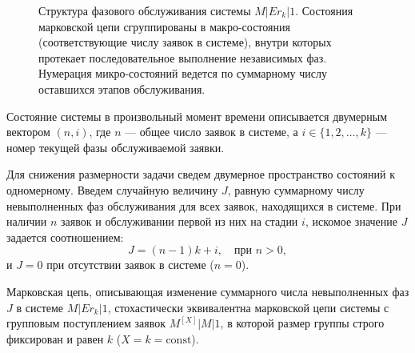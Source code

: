 \begin{figure}[h!]
\begin{center}
\caption{Структура фазового обслуживания системы $M|Er_k|1$. Состояния марковской цепи сгруппированы в макро-состояния (соответствующие числу заявок в системе), внутри которых протекает последовательное выполнение независимых фаз. Нумерация микро-состояний ведется по суммарному числу оставшихся этапов обслуживания.}
\end{center}
\end{figure}

Состояние системы в произвольный момент времени описывается двумерным вектором $(n, i)$, где $n$ — общее число заявок в системе, а $i \in \{1, 2, \dots, k\}$ — номер текущей фазы обслуживаемой заявки. 

Для снижения размерности задачи сведем двумерное пространство состояний к одномерному. Введем случайную величину $J$, равную суммарному числу невыполненных фаз обслуживания для всех заявок, находящихся в системе. При наличии $n$ заявок и обслуживании первой из них на стадии $i$, искомое значение $J$ задается соотношением:
$$ J = (n - 1)k + i, \quad \text{при } n > 0, $$
и $J = 0$ при отсутствии заявок в системе ($n = 0$).

\begin{statement}
Марковская цепь, описывающая изменение суммарного числа невыполненных фаз $J$ в системе $M|Er_k|1$, стохастически эквивалентна марковской цепи системы с групповым поступлением заявок $M^{[X]}|M|1$, в которой размер группы строго фиксирован и равен $k$ ($X = k = \text{const}$).
\end{statement}

